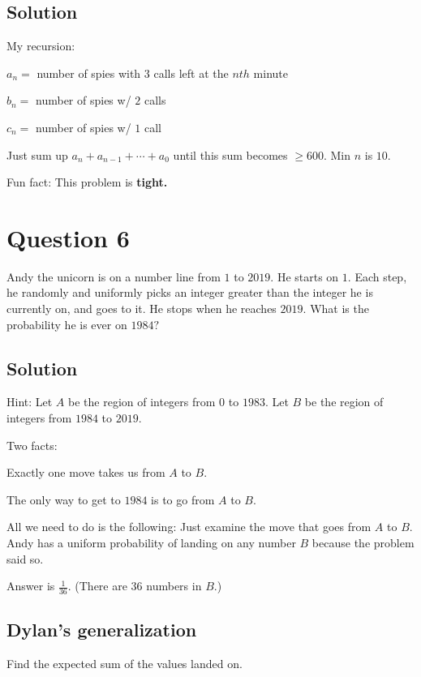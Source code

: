 \documentclass{article}
\begin{document}
\subsection{Solution}

My recursion:

$a_n=$ number of spies with $3$ calls left at the $nth$ minute

$b_n=$ number of spies w/ $2$ calls

$c_n=$ number of spies w/ $1$ call

Just sum up $a_n+a_{n-1}+\cdots+a_0$ until this sum becomes $\geq 600.$ Min $n$ is $10.$

Fun fact: This problem is \textbf{tight.}

\pagebreak\section{Question 6}

Andy the unicorn is on a number line from $1$ to $2019.$ He starts on $1.$ Each step, he randomly and uniformly picks an integer greater than the integer he is currently on, and goes to it. He stops when he reaches $2019.$ What is the probability he is ever on $1984?$

\subsection{Solution}

Hint: Let $A$ be the region of integers from $0$ to $1983.$ Let $B$ be the region of integers from $1984$ to $2019.$

Two facts:
\begin{itemize}
	\Item Exactly one move takes us from $A$ to $B$.
	
	\Item The only way to get to $1984$ is to go from $A$ to $B.$
\end{itemize}

All we need to do is the following: Just examine the move that goes from $A$ to $B.$ Andy has a uniform probability of landing on any number $B$ because the problem said so.

Answer is $\frac{1}{36}.$ (There are $36$ numbers in $B.$)

\subsection{Dylan's generalization}

\begin{exam}{}{}
Find the expected sum of the values landed on.
\end{exam}
\end{document}
